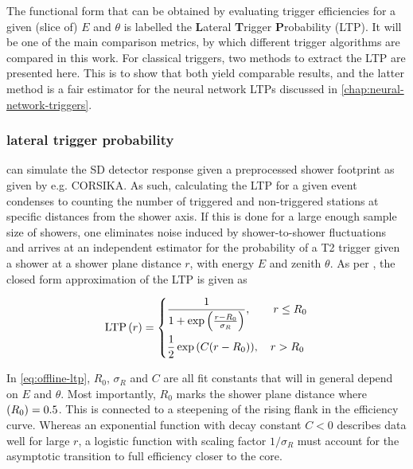 The functional form that can be obtained by evaluating trigger efficiencies for a given (slice of) $E$ and $\theta$ is labelled the \textbf{L}ateral 
\textbf{T}rigger \textbf{P}robability (LTP). It will be one of the main comparison metrics, by which different trigger algorithms are compared in this work. For 
classical triggers, two methods to extract the LTP are presented here. This is to show that both yield comparable results, and the latter method is a fair 
estimator for the neural network LTPs discussed in \autoref{chap:neural-network-triggers}.

\subsubsection{\Offline lateral trigger probability}
\label{sssec:offline-ltp}

\Offline can simulate the SD detector response given a preprocessed shower footprint as given by e.g. CORSIKA. As such, calculating the LTP for a given event
condenses to counting the number of triggered and non-triggered stations at specific distances from the shower axis. If this is done for a large enough sample size
of showers, one eliminates noise induced by shower-to-shower fluctuations and arrives at an independent estimator for the probability of a T2 trigger given a 
shower at a shower plane distance $r$, with energy $E$ and zenith $\theta$. As per \cite{abreu2011lateral}, the closed form approximation of the LTP is given as

\begin{equation}
	\label{eq:offline-ltp}
	\text{LTP}\left(r\right) = 
	\begin{dcases}
		\frac{1}{1 + \exp\left(\frac{r - R_0}{\sigma_R}\right)}, \qquad r \leq R_0 \\
		\frac{1}{2} \exp{\left(C(r-R_0)\right)},\;\;\;\,r > R_0
	\end{dcases}
\end{equation}

In \autoref{eq:offline-ltp}, $R_0$, $\sigma_R$ and $C$ are all fit constants that will in general depend on $E$ and $\theta$. Most importantly, $R_0$ marks the 
shower plane distance where $\text(R_0) = 0.5$. This is connected to a steepening of the rising flank in the efficiency curve. Whereas an exponential function with
decay constant $C<0$ describes data well for large $r$, a logistic function with scaling factor $1/\sigma_R$ must account for the asymptotic transition to full 
efficiency closer to the core.

